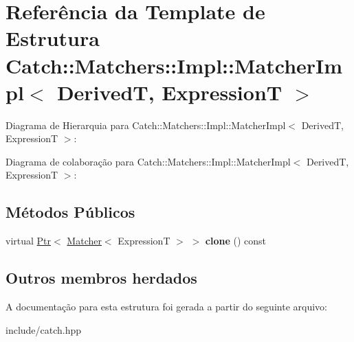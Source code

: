 \hypertarget{structCatch_1_1Matchers_1_1Impl_1_1MatcherImpl}{}\section{Referência da Template de Estrutura Catch\+:\+:Matchers\+:\+:Impl\+:\+:Matcher\+Impl$<$ DerivedT, ExpressionT $>$}
\label{structCatch_1_1Matchers_1_1Impl_1_1MatcherImpl}


Diagrama de Hierarquia para Catch\+:\+:Matchers\+:\+:Impl\+:\+:Matcher\+Impl$<$ DerivedT, ExpressionT $>$\+:


Diagrama de colaboração para Catch\+:\+:Matchers\+:\+:Impl\+:\+:Matcher\+Impl$<$ DerivedT, ExpressionT $>$\+:
\subsection*{Métodos Públicos}
\begin{DoxyCompactItemize}
\item 
virtual \hyperlink{classCatch_1_1Ptr}{Ptr}$<$ \hyperlink{structCatch_1_1Matchers_1_1Impl_1_1Matcher}{Matcher}$<$ ExpressionT $>$ $>$ {\bfseries clone} () const \hypertarget{structCatch_1_1Matchers_1_1Impl_1_1MatcherImpl_afe2e10779f91394f80ff5c894fb1bfab}{}\label{structCatch_1_1Matchers_1_1Impl_1_1MatcherImpl_afe2e10779f91394f80ff5c894fb1bfab}

\end{DoxyCompactItemize}
\subsection*{Outros membros herdados}


A documentação para esta estrutura foi gerada a partir do seguinte arquivo\+:\begin{DoxyCompactItemize}
\item 
include/catch.\+hpp\end{DoxyCompactItemize}
